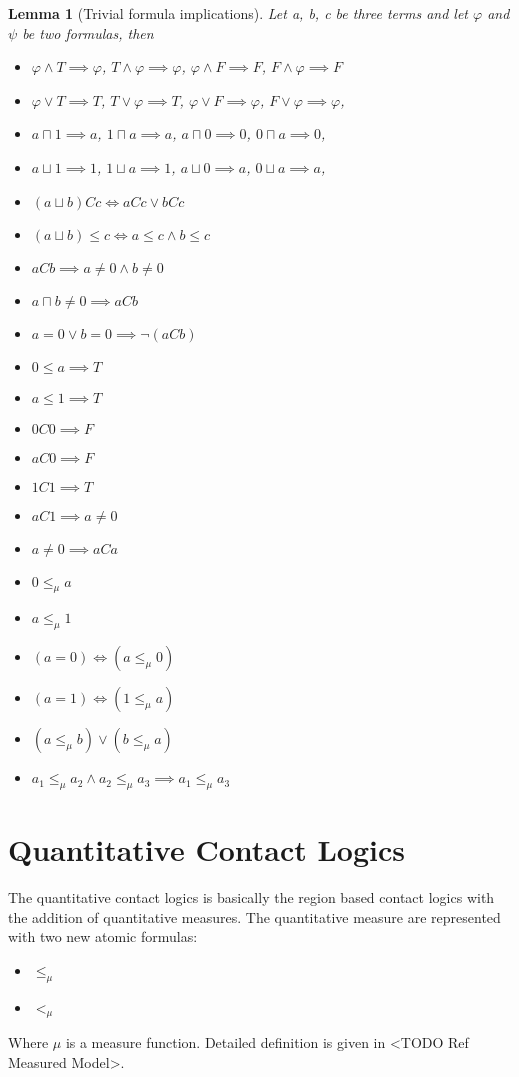 \documentclass{article}
\newtheorem{lemma}[theorem]{Lemma}
\begin{document}
\begin{lemma}[Trivial formula implications]
	Let a, b, c be three terms and let $\varphi$ and $\psi$ be two formulas, then
	\begin{itemize}
		\item $\varphi \land T \implies \varphi$,\;\; $T \land \varphi \implies \varphi$,\;\;
		      $\varphi \land F \implies F$,\;\; $F \land \varphi \implies F$
		\item $\varphi \lor T \implies T$,\;\; $T \lor \varphi \implies T$,\;\;
		      $\varphi \lor F \implies \varphi$,\;\; $F \lor \varphi \implies \varphi$,
		\item $a \sqcap 1 \implies a$,\;\; $1 \sqcap a \implies a$,\;\;
		      $a \sqcap 0 \implies 0$,\;\; $0 \sqcap a \implies 0$,
		\item $a \sqcup 1 \implies 1$,\;\; $1 \sqcup a \implies 1$,\;\;
		      $a \sqcup 0 \implies a$,\;\; $0 \sqcup a \implies a$,
		\item $(a \sqcup b)Cc \iff aCc \lor bCc$
		\item $(a \sqcup b) \leq c \iff a \leq c \land b \leq c$
		\item $aCb \implies a \neq 0 \land b \neq 0$
		\item $a \sqcap b \neq 0 \implies aCb$
		\item $a = 0 \lor b = 0 \implies \neg(aCb)$
		\item $0 \leq a \implies T$
		\item $a \leq 1 \implies T$
		\item $0C0 \implies F$
		\item $aC0 \implies F$
		\item $1C1 \implies T$
		\item $aC1 \implies a \neq 0$
		\item $a \neq 0 \implies aCa$
		\item $0 \le_\mu a$
		\item $a \le_\mu 1$
		\item $(a = 0) \iff (a \le_\mu 0)$
		\item $(a = 1) \iff (1 \le_\mu a)$
		\item $(a \le_\mu b) \lor (b \le_\mu a)$
		\item $a_1 \le_\mu a_2 \land a_2 \le_\mu a_3 \implies a_1 \le_\mu a_3$

	\end{itemize}
\end{lemma}

	\newpage
	\section{Quantitative Contact Logics}
		The quantitative contact logics is basically the region based contact logics with the addition of quantitative measures. The quantitative measure are represented 
		with two new atomic formulas:
		\begin{itemize} 
			\item $\le_\mu$
			\item $<_\mu$
		\end{itemize}
		Where $\mu$ is a measure function. Detailed definition is given in <TODO Ref Measured Model>.
	
\end{document}
